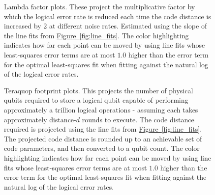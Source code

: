 \documentclass[onecolumn,a4paper,accepted=2022-09-12]{quantumarticle}
\theoremstyle{definition}
\theoremstyle{definition}
\theoremstyle{definition}
\newcommand{\fig}[1]{\hyperref[fig:#1]{Figure~\ref*{fig:#1}}}
\begin{document}
\begin{figure}[ht!]
    \centering
    \caption{
    Lambda factor plots.
    These project the multiplicative factor by which the logical error rate is reduced each time the code distance is increased by 2 at different noise rates.
    Estimated using the slope of the line fits from \fig{line_fits}.
    The color highlighting indicates how far each point can be moved by using line fits whose least-squares error terms are at most $1.0$ higher than the error term for the optimal least-squares fit when fitting against the natural log of the logical error rates.
    }
    \label{fig:lambdas}
\end{figure}

\begin{figure}[htb!]
    \centering
    \caption{
    Teraquop footprint plots.
    This projects the number of physical qubits required to store a logical qubit capable of performing approximately a trillion logical operations - assuming each takes approximately distance-$d$ rounds to execute.
    The code distance required is projected using the line fits from \fig{line_fits}.
    The projected code distance is rounded up to an achievable set of code parameters, and then converted to a qubit count.
    The color highlighting indicates how far each point can be moved by using line fits whose least-squares error terms are at most $1.0$ higher than the error term for the optimal least-squares fit when fitting against the natural log of the logical error rates.
    }
    \label{fig:teraquop_footprints}
\end{figure}
\end{document}
